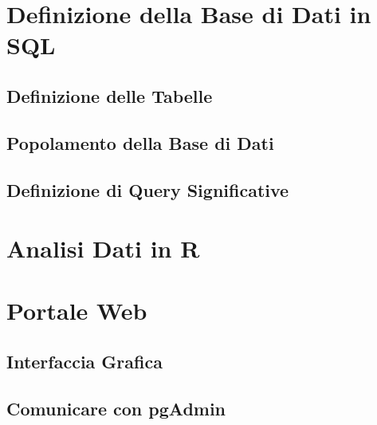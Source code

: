 \documentclass{article}
\begin{document}
\clearpage
\section{Definizione della Base di Dati in SQL}
\subsection{Definizione delle Tabelle}
\subsection{Popolamento della Base di Dati}
\subsection{Definizione di Query Significative}




\clearpage
\section{Analisi Dati in R}




\clearpage
\section{Portale Web}
\subsection{Interfaccia Grafica}
\subsection{Comunicare con pgAdmin}
\end{document}
